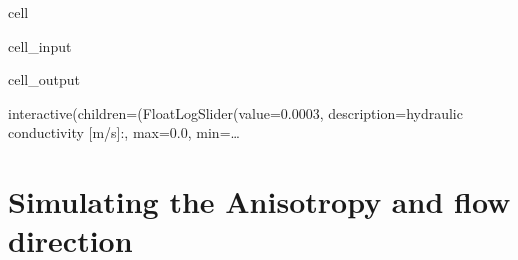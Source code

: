 \documentclass[letterpaper,10pt,english]{jupyterBook}
\begin{document}
\begin{sphinxuseclass}{cell}
\begin{sphinxVerbatimInput}
\begin{sphinxuseclass}{cell_input}
\begin{sphinxVerbatim}[commandchars=\\\{\}]
              
              
         
\end{sphinxVerbatim}

\end{sphinxuseclass}\end{sphinxVerbatimInput}
\begin{sphinxVerbatimOutput}

\begin{sphinxuseclass}{cell_output}
\begin{sphinxVerbatim}[commandchars=\\\{\}]
interactive(children=(FloatLogSlider(value=0.0003, description=\PYGZsq{}hydraulic conductivity [m/s]:\PYGZsq{}, max=0.0, min=\PYGZhy{}…
\end{sphinxVerbatim}

\end{sphinxuseclass}\end{sphinxVerbatimOutput}

\end{sphinxuseclass}
\sphinxstepscope


\chapter{Simulating the Anisotropy and flow direction}
\label{\detokenize{content/tools/aniso2D:simulating-the-anisotropy-and-flow-direction}}\label{\detokenize{content/tools/aniso2D::doc}}
\end{document}
